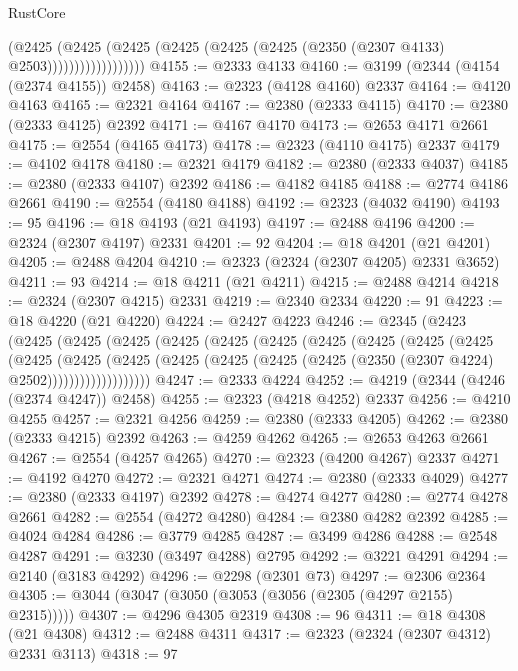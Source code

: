 \begin{lexlean}{RustCore}
\begin{coremodule}
                          (@2425
                            (@2425
                              (@2425
                                (@2425 (@2425 (@2425 (@2350 (@2307 @4133) @2503))))))))))))))))))
@4155 := @2333 @4133
@4160 := @3199 (@2344 (@4154 (@2374 @4155)) @2458)
@4163 := @2323 (@4128 @4160) @2337
@4164 := @4120 @4163
@4165 := @2321 @4164
@4167 := @2380 (@2333 @4115)
@4170 := @2380 (@2333 @4125) @2392
@4171 := @4167 @4170
@4173 := @2653 @4171 @2661
@4175 := @2554 (@4165 @4173)
@4178 := @2323 (@4110 @4175) @2337
@4179 := @4102 @4178
@4180 := @2321 @4179
@4182 := @2380 (@2333 @4037)
@4185 := @2380 (@2333 @4107) @2392
@4186 := @4182 @4185
@4188 := @2774 @4186 @2661
@4190 := @2554 (@4180 @4188)
@4192 := @2323 (@4032 @4190)
@4193 := 95
@4196 := @18 @4193 (@21 @4193)
@4197 := @2488 @4196
@4200 := @2324 (@2307 @4197) @2331
@4201 := 92
@4204 := @18 @4201 (@21 @4201)
@4205 := @2488 @4204
@4210 := @2323 (@2324 (@2307 @4205) @2331 @3652)
@4211 := 93
@4214 := @18 @4211 (@21 @4211)
@4215 := @2488 @4214
@4218 := @2324 (@2307 @4215) @2331
@4219 := @2340 @2334
@4220 := 91
@4223 := @18 @4220 (@21 @4220)
@4224 := @2427 @4223
@4246 := @2345
    (@2423
      (@2425
        (@2425
          (@2425
            (@2425
              (@2425
                (@2425
                  (@2425
                    (@2425
                      (@2425
                        (@2425
                          (@2425
                            (@2425
                              (@2425
                                (@2425
                                  (@2425 (@2425 (@2425 (@2350 (@2307 @4224) @2502)))))))))))))))))))
@4247 := @2333 @4224
@4252 := @4219 (@2344 (@4246 (@2374 @4247)) @2458)
@4255 := @2323 (@4218 @4252) @2337
@4256 := @4210 @4255
@4257 := @2321 @4256
@4259 := @2380 (@2333 @4205)
@4262 := @2380 (@2333 @4215) @2392
@4263 := @4259 @4262
@4265 := @2653 @4263 @2661
@4267 := @2554 (@4257 @4265)
@4270 := @2323 (@4200 @4267) @2337
@4271 := @4192 @4270
@4272 := @2321 @4271
@4274 := @2380 (@2333 @4029)
@4277 := @2380 (@2333 @4197) @2392
@4278 := @4274 @4277
@4280 := @2774 @4278 @2661
@4282 := @2554 (@4272 @4280)
@4284 := @2380 @4282 @2392
@4285 := @4024 @4284
@4286 := @3779 @4285
@4287 := @3499 @4286
@4288 := @2548 @4287
@4291 := @3230 (@3497 @4288) @2795
@4292 := @3221 @4291
@4294 := @2140 (@3183 @4292)
@4296 := @2298 (@2301 @73)
@4297 := @2306 @2364
@4305 := @3044 (@3047 (@3050 (@3053 (@3056 (@2305 (@4297 @2155) @2315)))))
@4307 := @4296 @4305 @2319
@4308 := 96
@4311 := @18 @4308 (@21 @4308)
@4312 := @2488 @4311
@4317 := @2323 (@2324 (@2307 @4312) @2331 @3113)
@4318 := 97

\end{coremodule}
\end{lexlean}
